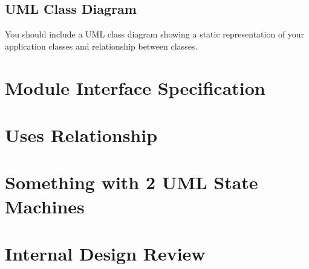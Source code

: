\documentclass[12pt]{article}
\begin{document}
    \subsection{UML Class Diagram}
    You should include a UML class diagram showing a static representation of your application classes and relationship between classes.

\section{Module Interface Specification}

\section{Uses Relationship}

\section{Something with 2 UML State Machines}

\section{Internal Design Review}
\end{document}
